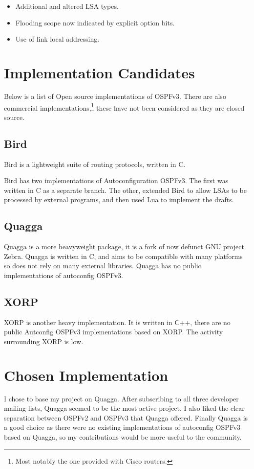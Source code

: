 \begin{itemize}
	\item Additional and altered LSA types.
	\item Flooding scope now indicated by explicit option bits.
	\item Use of link local addressing.
\end{itemize}

\section{Implementation Candidates}
Below is a list of Open source implementations of OSPFv3\@. There are also
commercial implementations,\footnote{Most notably the one provided with Cisco
routers.} these have not been considered as they are closed source. 

\subsection{Bird}
Bird\cite{BirdHome} is a lightweight suite of routing protocols, written
in C. 

Bird has two implementations of Autoconfiguration OSPFv3. The first was written
in C as a separate branch. The other, extended Bird to allow LSAs to be
processed by external programs, and then used Lua to implement the drafts.

\subsection{Quagga}
Quagga\cite{QuaggaHome} is a more heavyweight package, it is a fork of now
defunct GNU project Zebra. Quagga is written in C, and aims to be
compatible with many platforms so does not rely on many external libraries.
Quagga has no public implementations of autoconfig OSPFv3.

\subsection{XORP}
XORP\cite{XORPHome} is another heavy implementation. It is written in C++,
there are no public Autconfig OSPFv3 implementations based on XORP\@. The
activity surrounding XORP is low. 

\section{Chosen Implementation}
I chose to base my project on Quagga. After subscribing to all three developer
mailing lists, Quagga seemed to be the most active project.  I also liked the
clear separation between OSPFv2 and OSPFv3 that Quagga offered.  Finally Quagga
is a good choice as there were no existing implementations of autoconfig OSPFv3
based on Quagga, so my contributions would be more useful to the community.

